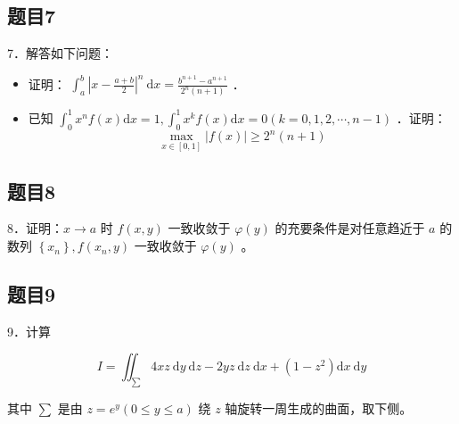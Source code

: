 \documentclass{article}
\begin{document}
\subsection{题目7}
7．解答如下问题：

\begin{itemize}
  \item[（1）] 证明： \(\int_{a}^{b}\left|x-\frac{a+b}{2}\right|^{n} \mathrm{~d} x=\frac{b^{n+1}-a^{n+1}}{2^{n}(n+1)}\) ．
  \item[（2）] 已知 \(\int_{0}^{1} x^{n} f(x) \mathrm{d} x=1, \int_{0}^{1} x^{k} f(x) \mathrm{d} x=0(k=0,1,2, \cdots, n-1)\) ．证明：
\[
\max _{x \in[0,1]}|f(x)| \geq 2^{n}(n+1)
\]
\end{itemize}

\subsection{题目8}
8．证明：\(x \rightarrow a\) 时 \(f(x, y)\) 一致收敛于 \(\varphi(y)\) 的充要条件是对任意趋近于 \(a\) 的数列 \(\left\{x_{n}\right\}, f\left(x_{n}, y\right)\) 一致收敛于 \(\varphi(y)\) 。

\subsection{题目9}
9．计算

\[
I=\iint_{\sum} 4 x z \mathrm{~d} y \mathrm{~d} z-2 y z \mathrm{~d} z \mathrm{~d} x+\left(1-z^{2}\right) \mathrm{d} x \mathrm{~d} y
\]

其中 \(\sum\) 是由 \(z=e^{y}(0 \leq y \leq a)\) 绕 \(z\) 轴旋转一周生成的曲面，取下侧。
\end{document}
